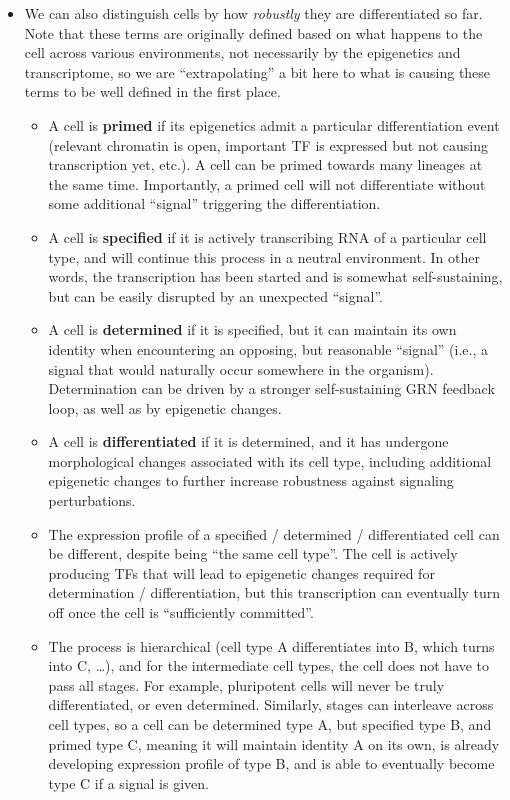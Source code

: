 \documentclass[11pt,a4paper]{article}
\begin{document}
\begin{itemize}
	\item We can also distinguish cells by how \emph{robustly} they are differentiated so far. Note that these terms are originally defined based on what happens to the cell across various environments, not necessarily by the epigenetics and transcriptome, so we are ``extrapolating'' a bit here to what is causing these terms to be well defined in the first place.
	\begin{itemize}
		\item A cell is \textbf{primed} if its epigenetics admit a particular differentiation event (relevant chromatin is open, important TF is expressed but not causing transcription yet, etc.). A cell can be primed towards many lineages at the same time. Importantly, a primed cell will not differentiate without some additional ``signal'' triggering the differentiation.
		\item A cell is \textbf{specified} if it is actively transcribing RNA of a particular cell type, and will continue this process in a neutral environment. In other words, the transcription has been started and is somewhat self-sustaining, but can be easily disrupted by an unexpected ``signal''.
		\item A cell is \textbf{determined} if it is specified, but it can maintain its own identity when encountering an opposing, but reasonable ``signal'' (i.e., a signal that would naturally occur somewhere in the organism). Determination can be driven by a stronger self-sustaining GRN feedback loop, as well as by epigenetic changes.
		\item A cell is \textbf{differentiated} if it is determined, and it has undergone morphological changes associated with its cell type, including additional epigenetic changes to further increase robustness against signaling perturbations.
		\item The expression profile of a specified / determined / differentiated cell can be different, despite being ``the same cell type''. The cell is actively producing TFs that will lead to epigenetic changes required for determination / differentiation, but this transcription can eventually turn off once the cell is ``sufficiently committed''.
		\item The process is hierarchical (cell type A differentiates into B, which turns into C, \dots), and for the intermediate cell types, the cell does not have to pass all stages. For example, pluripotent cells will never be truly differentiated, or even determined. Similarly, stages can interleave across cell types, so a cell can be determined type A, but specified type B, and primed type C, meaning it will maintain identity A on its own, is already developing expression profile of type B, and is able to eventually become type C if a signal is given.
	\end{itemize}


\end{itemize}
\end{document}

